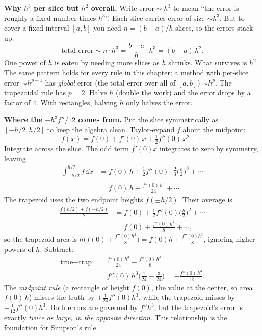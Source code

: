 \begin{happeningbox}
\textbf{Why $h^3$ per slice but $h^2$ overall.} Write $\text{error} \sim h^3$ to mean ``the error is roughly a fixed number times $h^3$''. Each slice carries error of size $\sim h^3$. But to cover a fixed interval $[a,b]$ you need $n = (b-a)/h$ slices, so the errors stack up:
\[
\text{total error} \sim n \cdot h^3 = \frac{b-a}{h}\cdot h^3 = (b-a)\,h^2.
\]
One power of $h$ is eaten by needing more slices as $h$ shrinks. What survives is $h^2$. The same pattern holds for every rule in this chapter: a method with per-slice error $\sim h^{p+1}$ has \emph{global} error (the total error over all of $[a,b]$) $\sim h^{p}$. The trapezoidal rule has $p=2$. Halve $h$ (double the work) and the error drops by a factor of $4$. With rectangles, halving $h$ only halves the error.
\end{happeningbox}

\begin{whybox}
\textbf{Where the $-h^3 f''/12$ comes from.} Put the slice symmetrically as $[-h/2, h/2]$ to keep the algebra clean. Taylor-expand $f$ about the midpoint:
\[
f(x) = f(0) + f'(0)\,x + \tfrac12 f''(0)\,x^2 + \cdots
\]
Integrate across the slice. The odd term $f'(0)x$ integrates to zero by symmetry, leaving
\begin{align*}
\int_{-h/2}^{h/2} f\,\dd x
  &= f(0)\,h + \tfrac12 f''(0)\cdot \frac{2}{3}\Big(\frac{h}{2}\Big)^3 + \cdots\\
  &= f(0)\,h + \frac{f''(0)\,h^3}{24} + \cdots
\end{align*}
The trapezoid uses the two endpoint heights $f(\pm h/2)$. Their average is
\begin{align*}
\frac{f(h/2)+f(-h/2)}{2}
  &= f(0) + \tfrac12 f''(0)\Big(\frac{h}{2}\Big)^2 + \cdots\\
  &= f(0) + \frac{f''(0)\,h^2}{8} + \cdots,
\end{align*}
so the trapezoid area is $h\big(f(0) + \tfrac{f''(0)h^2}{8}\big) = f(0)h + \tfrac{f''(0)h^3}{8}$, ignoring higher powers of $h$. Subtract:
\begin{align*}
\text{true} - \text{trap}
  &= \frac{f''(0)\,h^3}{24} - \frac{f''(0)\,h^3}{8}\\
  &= f''(0)\,h^3\Big(\frac{1}{24} - \frac{3}{24}\Big)
   = -\frac{f''(0)\,h^3}{12}.
\end{align*}
The \emph{midpoint rule} (a rectangle of height $f(0)$, the value at the center, so area $f(0)\,h$) misses the truth by $+\tfrac{1}{24}f''(0)h^3$, while the trapezoid misses by $-\tfrac{1}{12}f''(0)h^3$. Both errors are governed by $f'' h^3$, but the trapezoid's error is exactly
\emph{twice as large, in the opposite direction}. This relationship is the foundation
for Simpson's rule.
\end{whybox}


